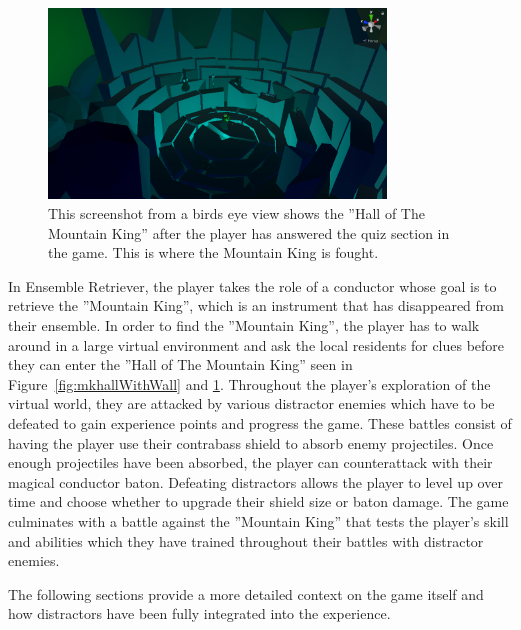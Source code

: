 \begin{figure}[tbph]
    \centering
    \includegraphics[width=0.8\textwidth]{figures/screenshots/HallOfTheMountainKing2KindaLowRes.png}
    \caption[Screenshot of the ''Hall of The Mountain King'' Without the Quiz Wall]{This screenshot from a birds eye view shows the ''Hall of The Mountain King'' after the player has answered the quiz section in the game. This is where the Mountain King is fought.}
    \label{fig:mkhallWithoutWall}
\end{figure}
In Ensemble Retriever, the player takes the role of a conductor whose goal is to retrieve the ''Mountain King'', which is an instrument that has disappeared from their ensemble. In order to find the ''Mountain King'', the player has to walk around in a large virtual environment and ask the local residents for clues before they can enter the ''Hall of The Mountain King'' seen in Figure~\ref{fig:mkhallWithWall} and \ref{fig:mkhallWithoutWall}. Throughout the player's exploration of the virtual world, they are attacked by various distractor enemies which have to be defeated to gain experience points and progress the game. These battles consist of having the player use their contrabass shield to absorb enemy projectiles. Once enough projectiles have been absorbed, the player can counterattack with their magical conductor baton. Defeating distractors allows the player to level up over time and choose whether to upgrade their shield size or baton damage. The game culminates with a battle against the ''Mountain King'' that tests the player's skill and abilities which they have trained throughout their battles with distractor enemies.  

The following sections provide a more detailed context on the game itself and how distractors have been fully integrated into the experience.


